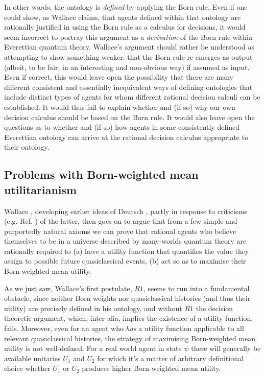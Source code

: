 \documentclass[aps,
pra,epsfig,12pt]{revtex4}
\begin{document}
In other words, the ontology is {\it defined} by applying the Born rule.   
Even if one could show, as Wallace claims, that agents defined within that 
ontology are rationally justified in using the Born rule as a 
calculus for decisions, it would seem incorrect to portray this
argument as a {\it derivation} of the Born rule within Everettian
quantum theory.   Wallace's argument should rather be understood
as attempting to show something weaker: that the Born rule re-emerges as output
(albeit, to be fair, in an interesting and non-obvious way) 
if assumed as input.  
Even if correct, this would leave 
open the possibility that there are many different 
consistent and essentially inequivalent ways of defining ontologies 
that include distinct types of agents for whom different rational 
decision calculi can be established.
It would thus fail to explain whether and (if so) why our own decision calculus
should be based on the Born rule.  It
would also leave open the questions as to whether and (if so) how   
agents in some consistently defined Everettian ontology can arrive 
at the rational decision calculus appropriate to their ontology. 

\subsection{Problems with Born-weighted mean utilitarianism} 

Wallace \cite{wallacevoltwo}, developing earlier 
ideas of Deutsch \cite{deutschtwo}, partly 
in response to criticisms (e.g. Ref. \cite{barnumetal}) of 
the latter, 
then goes on to argue that from a few simple and purportedly 
natural axioms we can prove that  
rational agents who believe 
themselves to be in a universe described by many-worlds quantum theory
are rationally required to (a) have a utility function that quantifies 
the value they assign to possible future quasiclassical events,
(b) act so as to maximise their Born-weighted mean utility.

As we just saw, Wallace's first postulate, $R1$, seems to run
into a fundamental obstacle, since neither Born weights nor 
quasiclassical histories (and thus their utility) are precisely
defined in his ontology, and without $R1$ the decision theoretic 
argument, which, inter alia, implies the existence of a utility function, 
fails.   Moreover, even for an agent who {\it has}
a utility function applicable to all relevant quasiclassical
histories, the strategy of maximising Born-weighted mean utility
is not well-defined.  For a real world agent in state $\psi$
there will generally be available unitaries $U_1$ and $U_2$ for 
which it's a matter of arbitrary definitional choice 
whether $U_1$ or $U_2$ produces higher Born-weighted mean utility. 
\end{document}
